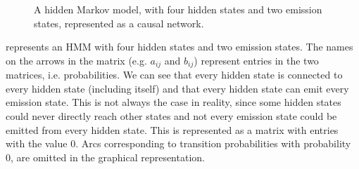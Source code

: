 \begin{figure}[htbp]
\caption[An HMM represented as a causal network.]{A hidden Markov model, with four hidden states and two emission states, represented as a causal network.}\label{fig:HMMCausalNet}
\end{figure}

 represents an HMM with four hidden states and two emission states. The names on the arrows in the matrix (e.g. $a_{ij}$ and $b_{ij}$) represent entries in the two matrices, i.e. probabilities. We can see that every hidden state is connected to every hidden state (including itself) and that every hidden state can emit every emission state. This is not always the case in reality, since some hidden states could never directly reach other states and not every emission state could be emitted from every hidden state. This is represented as a matrix with entries with the value 0. Arcs corresponding to transition probabilities with probability 0, are omitted in the graphical representation.

